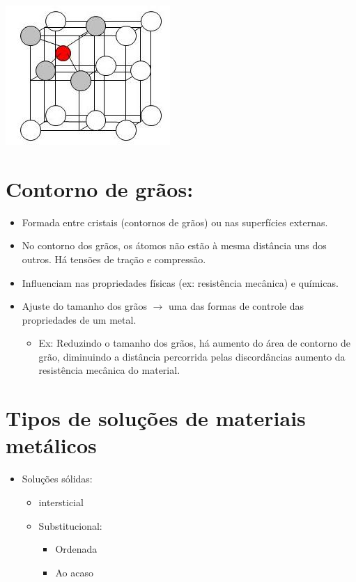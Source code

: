 \includegraphics[scale=0.5,trim={0 0 0 0}]{figures/tetcfc}



\section{Contorno de grãos:}

\begin{itemize}
	\item Formada entre cristais (contornos de grãos) ou nas superfícies externas.
	\item No contorno dos grãos, os átomos não estão à mesma distância uns dos outros. Há tensões de tração e compressão.
	\item Influenciam nas propriedades físicas (ex: resistência mecânica) e químicas.
	\item Ajuste do tamanho dos grãos $\rightarrow$ uma das formas de controle das propriedades de um metal.
	\begin{itemize}
		\item Ex: Reduzindo o tamanho dos grãos, há aumento do área de contorno de grão, diminuindo a distância percorrida pelas discordâncias aumento da resistência mecânica do material.
	\end{itemize}
\end{itemize}


\section{Tipos de soluções de materiais metálicos}

\begin{itemize}
	\item Soluções sólidas:
	\begin{itemize}
		\item intersticial
		\item Substitucional:
		\begin{itemize}
			\item Ordenada
			\item Ao acaso
		\end{itemize}
	\end{itemize}
\end{itemize}

